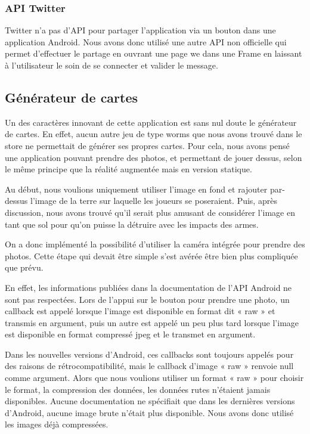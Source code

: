 \documentclass{report}
\begin{document}
\subsubsection{API Twitter}

Twitter n’a pas d’API pour partager l’application via un bouton dans une
application Android. Nous avons donc utilisé une autre API non
officielle qui permet d’effectuer le partage en ouvrant une page we
 dans une Frame en laissant à l’utilisateur le soin de se connecter et
 valider le message.

\subsection{Générateur de cartes}

Un des caractères innovant de cette application est sans nul doute le
générateur de cartes.
En effet, aucun autre jeu de type worms que nous avons trouvé dans le
store ne permettait de générer ses propres cartes. Pour cela, nous avons
pensé une application pouvant prendre des photos, et permettant de jouer
dessus, selon le même principe que la réalité augmentée mais en version
statique.
\bigskip

Au début, nous voulions uniquement utiliser l'image en fond et rajouter
par-dessus l'image de la terre sur laquelle les joueurs se poseraient.
Puis, après discussion, nous avons trouvé qu'il serait plus amusant de
considérer l'image en tant que sol pour qu'on puisse la détruire avec
les impacts des armes.
\bigskip

On a donc implémenté la possibilité d'utiliser la caméra intégrée pour
prendre des photos. Cette étape qui devait être simple s'est avérée être
bien plus compliquée que prévu.

En effet, les informations publiées dans
la documentation de l'API Android ne sont pas respectées. Lors de
l'appui sur le bouton pour prendre une photo, un callback est appelé
lorsque l'image est disponible en format dit « raw » et transmis en
argument, puis un autre est appelé un peu plus tard lorsque l'image est
disponible en format compressé jpeg et le transmet en argument.

Dans les nouvelles versions d'Android, ces callbacks sont toujours
appelés pour des raisons de rétrocompatibilité, mais le callback
d'image « raw » renvoie null comme argument. Alors que nous voulions
utiliser un format « raw » pour choisir le format, la compression des
données, les données rutes n'étaient jamais disponibles. Aucune
documentation ne spécifiait que dans les dernières versions d'Android,
aucune image brute n'était plus disponible. Nous avons donc utilisé les
images déjà compressées.
\bigskip
\end{document}

